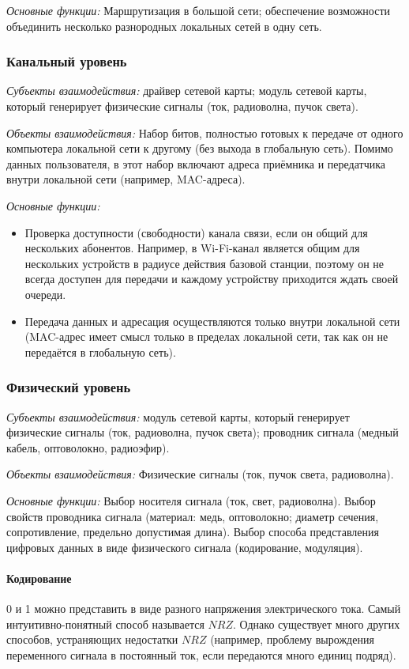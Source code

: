 \emph{Основные функции:} Маршрутизация в большой сети; обеспечение возможности объединить несколько разнородных локальных сетей в одну сеть.

\subsubsection*{Канальный уровень}\label{subsubsec:data-link-layer}
\emph{Субъекты взаимодействия:} драйвер сетевой карты; модуль сетевой карты, который генерирует физические сигналы (ток, радиоволна, пучок света).

\emph{Объекты взаимодействия:} Набор битов, полностью готовых к передаче от одного компьютера локальной сети к другому (без выхода в глобальную сеть). Помимо данных пользователя, в этот набор включают адреса приёмника и передатчика внутри локальной сети (например, MAC-адреса).

\emph{Основные функции:}
\begin{itemize}
    \item Проверка доступности (свободности) канала связи, если он общий для нескольких абонентов. Например, в Wi-Fi-канал является общим для нескольких устройств в радиусе действия базовой станции, поэтому он не всегда доступен для передачи и каждому устройству приходится ждать своей очереди.
    \item Передача данных и адресация осуществляются только внутри локальной сети (MAC-адрес имеет смысл только в пределах локальной сети, так как он не передаётся в глобальную сеть).
\end{itemize}

\subsubsection*{Физический уровень}\label{subsubsec:physical-layer}
\emph{Субъекты взаимодействия:} модуль сетевой карты, который генерирует физические сигналы (ток, радиоволна, пучок света); проводник сигнала (медный кабель, оптоволокно, радиоэфир).

\emph{Объекты взаимодействия:} Физические сигналы (ток, пучок света, радиоволна).

\emph{Основные функции:} Выбор носителя сигнала (ток, свет, радиоволна). Выбор свойств проводника сигнала (материал: медь,
оптоволокно; диаметр сечения, сопротивление, предельно допустимая длина). Выбор способа представления цифровых данных в виде физического сигнала (кодирование, модуляция).

\paragraph{Кодирование}\label{par:encoding}
0 и 1 можно представить в виде разного напряжения электрического тока. Самый интуитивно-понятный способ называется $NRZ$. Однако существует много других способов, устраняющих недостатки $NRZ$ (например, проблему вырождения переменного сигнала в постоянный ток, если передаются много единиц подряд).

